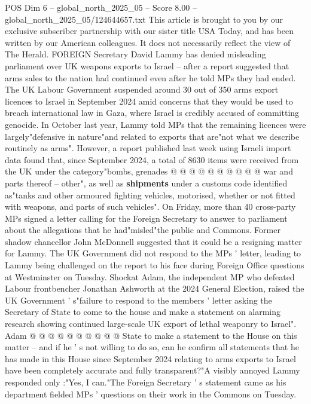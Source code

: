 \begin{textsample}{POS Dim 6 – global\_north\_2025\_05 – Score 8.00 – global\_north\_2025\_05/124644657.txt}  \label{ex:f6_pos_069}
This article is brought to you by our exclusive subscriber partnership with our sister title USA Today, and has been written by our American colleagues.
It does not necessarily reflect the view of The Herald.
FOREIGN Secretary David Lammy has denied misleading parliament over UK weapons exports to Israel -- after a report suggested that arms sales to the nation had continued even after he told MPs they had ended.
The UK Labour Government suspended around 30 out of 350 arms export licences to Israel in September 2024 amid concerns that they would be used to breach international law in Gaza, where Israel is credibly accused of committing genocide.
In October last year, Lammy told MPs that the remaining licences were largely"defensive in nature"and related to exports that are"not what we describe routinely as arms".
However, a report published last week using Israeli import data found that, since September 2024, a total of 8630 items were received from the UK under the category"bombs, grenades @ @ @ @ @ @ @ @ @ @ war and parts thereof -- other", as well as \textbf{shipments} under a customs code identified as"tanks and other armoured fighting vehicles, motorised, whether or not fitted with weapons, and parts of such vehicles".
On Friday, more than 40 cross-party MPs signed a letter calling for the Foreign Secretary to answer to parliament about the allegations that he had"misled"the public and Commons.
Former shadow chancellor John McDonnell suggested that it could be a resigning matter for Lammy.
The UK Government did not respond to the MPs ' letter, leading to Lammy being challenged on the report to his face during Foreign Office questions at Westminster on Tuesday.
Shockat Adam, the independent MP who defeated Labour frontbencher Jonathan Ashworth at the 2024 General Election, raised the UK Government ' s"failure to respond to the members ' letter asking the Secretary of State to come to the house and make a statement on alarming research showing continued large-scale UK export of lethal weaponry to Israel".
Adam @ @ @ @ @ @ @ @ @ @ State to make a statement to the House on this matter -- and if he ' s not willing to do so, can he confirm all statements that he has made in this House since September 2024 relating to arms exports to Israel have been completely accurate and fully transparent?"A visibly annoyed Lammy responded only :"Yes, I can."The Foreign Secretary ' s statement came as his department fielded MPs ' questions on their work in the Commons on Tuesday.

\end{textsample}
